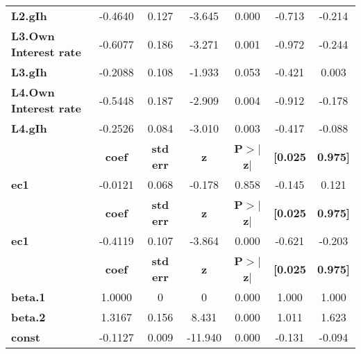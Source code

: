 \begin{center}
\begin{tabular}{lcccccc}
\textbf{L2.gIh}               &      -0.4640  &        0.127     &    -3.645  &         0.000        &       -0.713    &       -0.214     \\
\textbf{L3.Own Interest rate} &      -0.6077  &        0.186     &    -3.271  &         0.001        &       -0.972    &       -0.244     \\
\textbf{L3.gIh}               &      -0.2088  &        0.108     &    -1.933  &         0.053        &       -0.421    &        0.003     \\
\textbf{L4.Own Interest rate} &      -0.5448  &        0.187     &    -2.909  &         0.004        &       -0.912    &       -0.178     \\
\textbf{L4.gIh}               &      -0.2526  &        0.084     &    -3.010  &         0.003        &       -0.417    &       -0.088     \\
             & \textbf{coef} & \textbf{std err} & \textbf{z} & \textbf{P$> |$z$|$} & \textbf{[0.025} & \textbf{0.975]}  \\
\midrule
\textbf{ec1} &      -0.0121  &        0.068     &    -0.178  &         0.858        &       -0.145    &        0.121     \\
             & \textbf{coef} & \textbf{std err} & \textbf{z} & \textbf{P$> |$z$|$} & \textbf{[0.025} & \textbf{0.975]}  \\
\midrule
\textbf{ec1} &      -0.4119  &        0.107     &    -3.864  &         0.000        &       -0.621    &       -0.203     \\
                & \textbf{coef} & \textbf{std err} & \textbf{z} & \textbf{P$> |$z$|$} & \textbf{[0.025} & \textbf{0.975]}  \\
\midrule
\textbf{beta.1} &       1.0000  &            0     &         0  &         0.000        &        1.000    &        1.000     \\
\textbf{beta.2} &       1.3167  &        0.156     &     8.431  &         0.000        &        1.011    &        1.623     \\
\textbf{const}  &      -0.1127  &        0.009     &   -11.940  &         0.000        &       -0.131    &       -0.094     \\
\bottomrule
\end{tabular}
\end{center}
